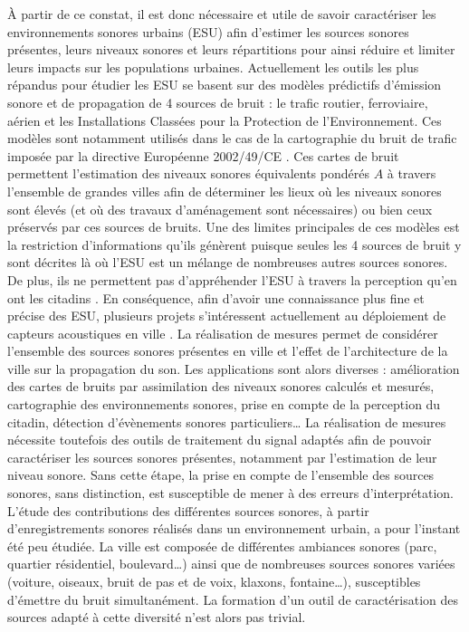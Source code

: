 À partir de ce constat, il est donc nécessaire et utile de savoir caractériser les environnements sonores urbains (ESU) afin d'estimer les sources sonores présentes, leurs niveaux sonores et leurs répartitions pour ainsi réduire et limiter leurs impacts sur les populations urbaines.
Actuellement les outils les plus répandus pour étudier les ESU se basent sur des modèles prédictifs d'émission sonore et de propagation de 4 sources de bruit : le trafic routier, ferroviaire, aérien et les Installations Classées pour la Protection de l'Environnement. Ces modèles sont notamment utilisés dans le cas de la cartographie du bruit de trafic imposée par la directive Européenne 2002/49/CE \cite{directive}. Ces cartes de bruit permettent l'estimation des niveaux sonores équivalents pondérés $A$ à travers l'ensemble de grandes villes afin de déterminer les lieux où les niveaux sonores sont élevés (et où des travaux d'aménagement sont nécessaires) ou bien ceux préservés par ces sources de bruits. Une des limites principales de ces modèles est la restriction d'informations qu'ils génèrent puisque seules les 4 sources de bruit y sont décrites là où l'ESU est un mélange de nombreuses autres sources sonores. De plus, ils ne permettent pas d'appréhender l'ESU à travers la perception qu'en ont les citadins \cite{aumond2017modeling}. 
En conséquence, afin d'avoir une connaissance plus fine et précise des ESU, plusieurs projets s'intéressent actuellement au déploiement de capteurs acoustiques en ville \cite{picaut2017characterization,zambon2017life}. La réalisation de mesures permet de considérer l'ensemble des sources sonores présentes en ville et l'effet de l'architecture de la ville sur la propagation du son. Les applications sont alors diverses : amélioration des cartes de bruits par assimilation des niveaux sonores calculés et mesurés, cartographie des environnements sonores, prise en compte de la perception du citadin, détection d'évènements sonores particuliers\dots{}
La réalisation de mesures nécessite toutefois des outils de traitement du signal adaptés afin de pouvoir caractériser les sources sonores présentes, notamment par l'estimation de leur niveau sonore. Sans cette étape, la prise en compte de l'ensemble des sources sonores, sans distinction, est susceptible de mener à des erreurs d'interprétation. L'étude des contributions des différentes sources sonores, à partir d'enregistrements sonores réalisés dans un environnement urbain, a pour l'instant été peu étudiée. 
La ville est composée de différentes ambiances sonores (parc, quartier résidentiel, boulevard\dots{}) ainsi que de nombreuses sources sonores variées (voiture, oiseaux, bruit de pas et de voix, klaxons, fontaine\dots{}), susceptibles d'émettre du bruit simultanément. La formation d'un outil de caractérisation des sources adapté à cette diversité n'est alors pas trivial.


